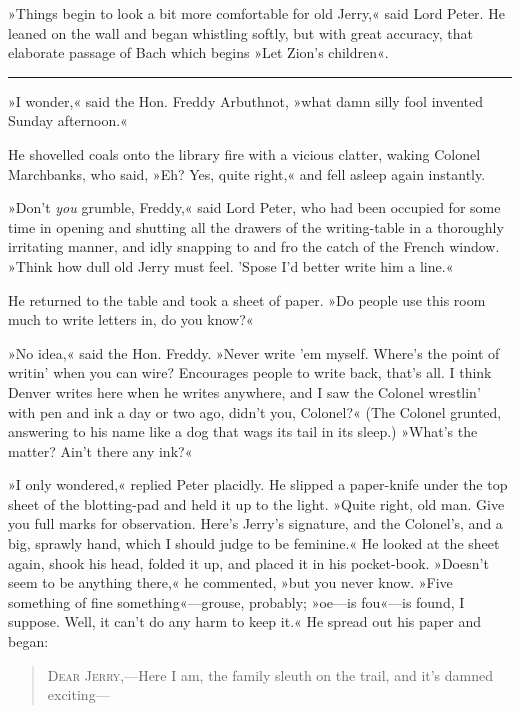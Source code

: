 »Things begin to look a bit more comfortable for old Jerry,« said Lord Peter. He leaned on the wall and began whistling softly, but with great accuracy, that elaborate passage of Bach which begins »Let Zion's children«.

\noindent\hfil\rule{0.5\textwidth}{.4pt}\hfil

»I wonder,« said the Hon. Freddy Arbuthnot, »what damn silly fool invented Sunday afternoon.«

He shovelled coals onto the library fire with a vicious clatter, waking Colonel Marchbanks, who said, »Eh? Yes, quite right,« and fell asleep again instantly.

»Don't \textit{you} grumble, Freddy,« said Lord Peter, who had been occupied for some time in opening and shutting all the drawers of the writing-table in a thoroughly irritating manner, and idly snapping to and fro the catch of the French window. »Think how dull old Jerry must feel. 'Spose I'd better write him a line.«

He returned to the table and took a sheet of paper. »Do people use this room much to write letters in, do you know?«

»No idea,« said the Hon. Freddy. »Never write 'em myself. Where's the point of writin' when you can wire? Encourages people to write back, that's all. I think Denver writes here when he writes anywhere, and I saw the Colonel wrestlin' with pen and ink a day or two ago, didn't you, Colonel?« (The Colonel grunted, answering to his name like a dog that wags its tail in its sleep.) »What's the matter? Ain't there any ink?«

»I only wondered,« replied Peter placidly. He slipped a paper-knife under the top sheet of the blotting-pad and held it up to the light.  »Quite right, old man. Give you full marks for observation. Here's Jerry's signature, and the Colonel's, and a big, sprawly hand, which I should judge to be feminine.« He looked at the sheet again, shook his head, folded it up, and placed it in his pocket-book. »Doesn't seem to be anything there,« he commented, »but you never know. »Five something of fine something«---grouse, probably; »oe\allowbreak---\allowbreak is fou«---is found, I suppose. Well, it can't do any harm to keep it.« He spread out his paper and began:

\begin{quote}
\textsc{Dear Jerry},---Here I am, the family sleuth on the trail, and it's damned exciting---
\end{quote}

